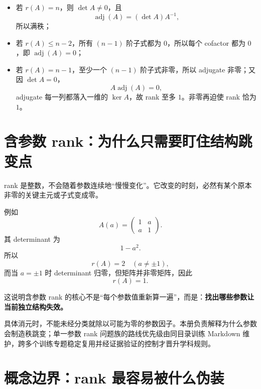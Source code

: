 \documentclass[11pt,a4paper]{ctexart}
\newcommand{\kw}[1]{\textbf{\color{deep}#1}}
\begin{document}
\begin{itemize}
  \item 若 $r(A)=n$，则 $\det A\neq0$，且
  \[
  \operatorname{adj}(A)=(\det A)A^{-1},
  \]
  所以满秩；
  \item 若 $r(A)\le n-2$，所有 $(n-1)$ 阶子式都为 $0$，所以每个 cofactor 都为 $0$，即 $\operatorname{adj}(A)=0$；
  \item 若 $r(A)=n-1$，至少一个 $(n-1)$ 阶子式非零，所以 adjugate 非零；又因 $\det A=0$，
  \[
  A\operatorname{adj}(A)=0,
  \]
  adjugate 每一列都落入一维的 $\ker A$，故 rank 至多 $1$。非零再迫使 rank 恰为 $1$。
\end{itemize}

\section{含参数 rank：为什么只需要盯住结构跳变点}

rank 是整数，不会随着参数连续地“慢慢变化”。它改变的时刻，必然有某个原本非零的关键主元或子式变成零。

例如
\[
A(a)=\begin{pmatrix}1&a\\a&1\end{pmatrix}.
\]
其 determinant 为
\[
1-a^2.
\]
所以
\[
r(A)=2\quad(a\neq\pm1),
\]
而当 $a=\pm1$ 时 determinant 归零，但矩阵并非零矩阵，因此
\[
r(A)=1.
\]

这说明含参数 rank 的核心不是“每个参数值重新算一遍”，而是：\kw{找出哪些参数让当前独立结构失效。}

具体消元时，不能未经分类就除以可能为零的参数因子。本册负责解释为什么参数会制造秩跳变；单一参数 rank 问题族的路线优先级由同目录训练 Markdown 维护，跨多个训练专题稳定复用并经证据验证的控制才晋升学科规则。

\section{概念边界：rank 最容易被什么伪装}
\end{document}
